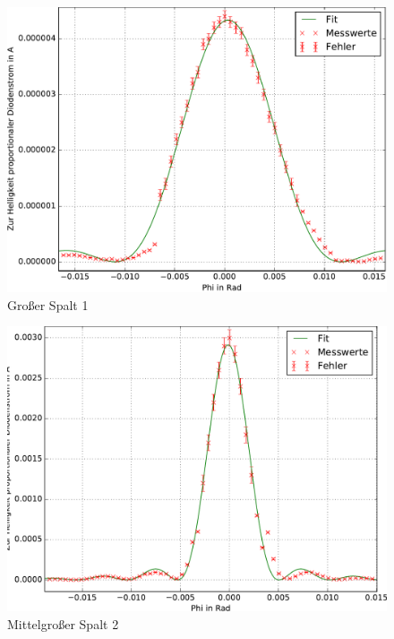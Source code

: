       \begin{figure}[H]
          \centering
          \includegraphics[width=.9\textwidth]{../plots/single_slit1.pdf}
          \caption{Großer Spalt 1}
          \label{fig:sub5}
      \end{figure}%
      
      \begin{figure}[H]
          \centering
          \includegraphics[width=.9\textwidth]{../plots/single_slit2.pdf}
          \caption{Mittelgroßer Spalt 2}
          \label{fig:sub4}
      \end{figure}%
      
